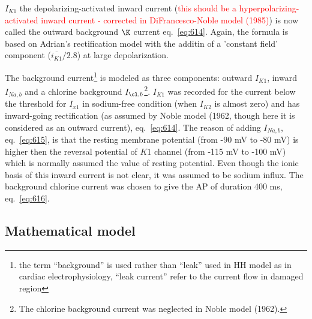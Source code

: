 $I_{K1}$ the depolarizing-activated inward current (\textcolor{red}{this
should be a hyperpolarizing-activated inward current - corrected in
DiFrancesco-Noble model (1985)}) is now called the outward background $\K$
current eq.~\eqref{eq:614}. Again, the formula is based on Adrian's
rectification model with the additin of a 'constant field' component
($\overline{i_{K1}}/2.8$) at large depolarization.

The background current\footnote{the term ``background'' is used rather than
``leak'' used in HH model as in cardiac electrophysiology, ``leak current''
refer to the current flow in damaged region} is modeled as three components:
outward $I_{K1}$, inward $I_{Na,b}$ and a chlorine background
$I_{\cl,b}$\footnote{The chlorine background current was neglected in
  Noble model (1962).}.
$I_{K1}$ was recorded for the current below the threshold for $I_{x1}$
in sodium-free condition (when $I_{K2}$ is almost zero) and has
inward-going rectification (as assumed by Noble model (1962, though
here it is considered as an outward current), eq.~\eqref{eq:614}. The
reason of adding $I_{Na,b}$, eq.~\eqref{eq:615}, is that the resting
membrane potential (from -90 mV to -80 mV) is higher then the reversal
potential of $K1$ channel (from -115 mV to -100 mV) which is normally
assumed the value of resting potential. Even though the ionic basis of
this inward current is not clear, it was assumed to be sodium influx.
The background chlorine current was chosen to give the AP of duration
400 ms, eq.~\eqref{eq:616}.

\subsection{Mathematical model}
\label{sec:mathematical-model-5}


